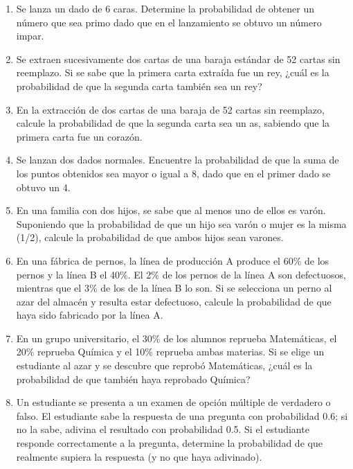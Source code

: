 \documentclass[letterpaper,11pt,spanish]{article}
\begin{document}
\begin{enumerate}
 \item   Se lanza un dado de 6 caras. Determine la probabilidad de obtener un número que sea primo dado que en el lanzamiento se obtuvo un número impar.
    
    \item Se extraen sucesivamente dos cartas de una baraja estándar de 52 cartas sin reemplazo. Si se sabe que la primera carta extraída fue un rey, ¿cuál es la probabilidad de que la segunda carta también sea un rey?
    
    \item En la extracción de dos cartas de una baraja de 52 cartas sin reemplazo, calcule la probabilidad de que la segunda carta sea un as, sabiendo que la primera carta fue un corazón.
    
    \item Se lanzan dos dados normales. Encuentre la probabilidad de que la suma de los puntos obtenidos sea mayor o igual a 8, dado que en el primer dado se obtuvo un 4.
    
    \item En una familia con dos hijos, se sabe que al menos uno de ellos es varón. Suponiendo que la probabilidad de que un hijo sea varón o mujer es la misma (1/2), calcule la probabilidad de que ambos hijos sean varones.
    
    
    \item En una fábrica de pernos, la línea de producción A produce el 60\% de los pernos y la línea B el 40\%. El 2\% de los pernos de la línea A son defectuosos, mientras que el 3\% de los de la línea B lo son. Si se selecciona un perno al azar del almacén y resulta estar defectuoso, calcule la probabilidad de que haya sido fabricado por la línea A.
    
    \item En un grupo universitario, el 30\% de los alumnos reprueba Matemáticas, el 20\% reprueba Química y el 10\% reprueba ambas materias. Si se elige un estudiante al azar y se descubre que reprobó Matemáticas, ¿cuál es la probabilidad de que también haya reprobado Química?
    
    
    \item Un estudiante se presenta a un examen de opción múltiple de verdadero o falso. El estudiante sabe la respuesta de una pregunta con probabilidad 0.6; si no la sabe, adivina el resultado con probabilidad 0.5. Si el estudiante responde correctamente a la pregunta, determine la probabilidad de que realmente supiera la respuesta (y no que haya adivinado).
    

\end{enumerate}
\end{document}
